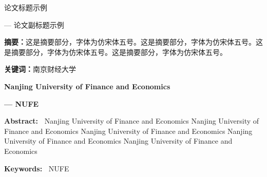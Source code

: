 \documentclass[a4paper]{article}
\newcommand{\zhaiyao}{\CJKfamily{fsong}\fontsize{10.5pt}{28pt}\selectfont}
\begin{document}
\begin{center}
  {\fontsize{22pt}{28pt}\selectfont 论文标题示例}
\end{center}

\begin{center}
  {\fontsize{16pt}{28pt}\selectfont --- 论文副标题示例}
\end{center}

\vspace{1em}


{\zhaiyao

\textbf{摘要：}这是摘要部分，字体为仿宋体五号。这是摘要部分，字体为仿宋体五号。这是摘要部分，字体为仿宋体五号。这是摘要部分，字体为仿宋体五号。
\par\textbf{关键词：}南京\hspace*{2em}财经\hspace*{2em}大学

}

\vspace{2em}


\begin{center}
  {\fontsize{16pt}{28pt}\selectfont \textbf{Nanjing University of Finance and Economics}}
\end{center}

\begin{center}
  {\fontsize{14pt}{28pt}\selectfont \textbf{ --- NUFE}}
\end{center}


{\fontsize{10.5pt}{28pt}\selectfont

\textbf{Abstract:~} Nanjing University of Finance and Economics Nanjing University of Finance and Economics Nanjing University of Finance and Economics 
Nanjing University of Finance and Economics Nanjing University of Finance and Economics

\par\textbf{Keywords:~} N\hspace*{2em}U\hspace*{2em}F\hspace*{2em}E

}

\newpage
\end{document}
